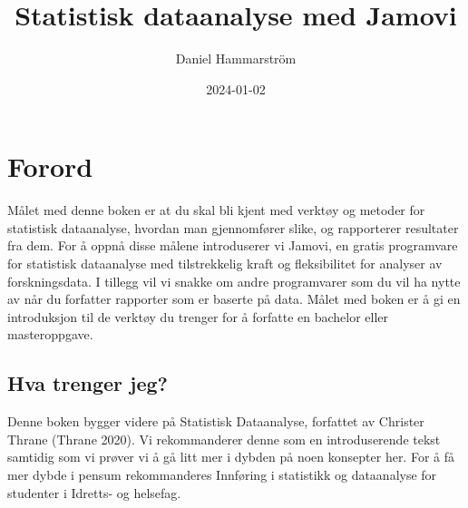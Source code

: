 \documentclass[
  letterpaper,
  DIV=11,
  numbers=noendperiod,
  oneside]{scrreprt}
\title{Statistisk dataanalyse med Jamovi}
\author{Daniel Hammarström}
\date{2024-01-02}
\renewcommand*\contentsname{Table of contents}
\newcommand\contentsname{Table of contents}
\begin{document}
\maketitle
\ifdefined\Shaded\renewenvironment{Shaded}{\begin{tcolorbox}[breakable, sharp corners, interior hidden, borderline west={3pt}{0pt}{shadecolor}, boxrule=0pt, frame hidden, enhanced]}{\end{tcolorbox}}\fi

\renewcommand*\contentsname{Table of contents}
{
\hypersetup{linkcolor=}
\setcounter{tocdepth}{2}
\tableofcontents
}

\hypertarget{forord}{%
\chapter*{Forord}\label{forord}}


Målet med denne boken er at du skal bli kjent med verktøy og metoder for
statistisk dataanalyse, hvordan man gjennomfører slike, og rapporterer
resultater fra dem. For å oppnå disse målene introduserer vi Jamovi, en
gratis programvare for statistisk dataanalyse med tilstrekkelig kraft og
fleksibilitet for analyser av forskningsdata. I tillegg vil vi snakke om
andre programvarer som du vil ha nytte av når du forfatter rapporter som
er baserte på data. Målet med boken er å gi en introduksjon til de
verktøy du trenger for å forfatte en bachelor eller
masteroppgave.

\hypertarget{hva-trenger-jeg}{%
\section*{Hva trenger jeg?}\label{hva-trenger-jeg}}


Denne boken bygger videre på Statistisk Dataanalyse, forfattet av
Christer Thrane (Thrane
2020).
Vi rekommanderer denne som en introduserende tekst samtidig som vi
prøver vi å gå litt mer i dybden på noen konsepter her. For å få mer
dybde i pensum rekommanderes Innføring i statistikk og dataanalyse for
studenter i Idretts- og helsefag.
\end{document}
